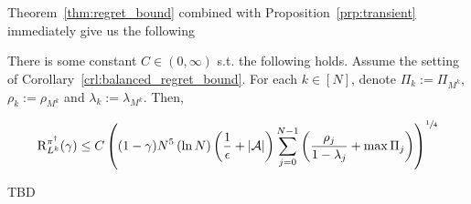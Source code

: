 \documentclass[anon,12pt]{colt2018} %
\newcommand{\AP}[1]{\left(#1\right)}
\newcommand{\Abs}[1]{\left\vert #1 \right\vert}
\newcommand{\A}{\mathcal{A}}
\newcommand{\Rg}{\operatorname{R}}
\begin{document}
Theorem~\ref{thm:regret_bound} combined with Proposition~\ref{prp:transient} immediately give us the following

\begin{samepage}
\begin{corollary}
\label{crl:regret_bound_mixing}

There is some constant $C \in (0,\infty)$ s.t. the following holds. Assume the setting of Corollary~\ref{crl:balanced_regret_bound}. For each $k \in [N]$, denote $\Pi_k:=\Pi_{M^k}$, $\rho_k:=\rho_{M^k}$ and $\lambda_k:=\lambda_{M^k}$. Then,

\begin{equation}
\Rg_{L^k}^{\pi^\dagger}(\gamma)\leq C\AP{(1-\gamma)N^5 \AP{\ln N} \AP{\frac{1}{\epsilon}+\Abs{\A}}\sum_{j=0}^{N-1} \AP{\frac{\rho_j}{1-\lambda_j}+\max{\Pi_j}}}^{\sfrac{1}{4}}
\end{equation}



\end{corollary}
\end{samepage}

TBD
\end{document}
